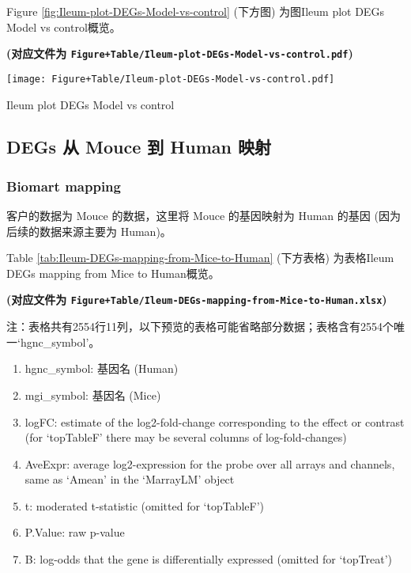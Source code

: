 \documentclass[
]{article}
\providecommand{\tightlist}{%
  \setlength{\itemsep}{0pt}\setlength{\parskip}{0pt}}
\begin{document}
Figure \ref{fig:Ileum-plot-DEGs-Model-vs-control} (下方图) 为图Ileum plot DEGs Model vs control概览。

\textbf{(对应文件为 \texttt{Figure+Table/Ileum-plot-DEGs-Model-vs-control.pdf})}

\def\@captype{figure}
\begin{center}
\texttt{[image: Figure+Table/Ileum-plot-DEGs-Model-vs-control.pdf]}
\caption{Ileum plot DEGs Model vs control}\label{fig:Ileum-plot-DEGs-Model-vs-control}
\end{center}

\hypertarget{degs-ux4ece-mouce-ux5230-human-ux6620ux5c04-1}{%
\subsection{DEGs 从 Mouce 到 Human 映射}\label{degs-ux4ece-mouce-ux5230-human-ux6620ux5c04-1}}

\hypertarget{biomart-mapping-1}{%
\subsubsection{Biomart mapping}\label{biomart-mapping-1}}

客户的数据为 Mouce 的数据，这里将 Mouce 的基因映射为 Human 的基因 (因为后续的数据来源主要为 Human)。

Table \ref{tab:Ileum-DEGs-mapping-from-Mice-to-Human} (下方表格) 为表格Ileum DEGs mapping from Mice to Human概览。

\textbf{(对应文件为 \texttt{Figure+Table/Ileum-DEGs-mapping-from-Mice-to-Human.xlsx})}

\begin{center}\begin{tcolorbox}[colback=gray!10, colframe=gray!50, width=0.9\linewidth, arc=1mm, boxrule=0.5pt]注：表格共有2554行11列，以下预览的表格可能省略部分数据；表格含有2554个唯一`hgnc\_symbol'。
\end{tcolorbox}
\end{center}
\begin{center}\begin{tcolorbox}[colback=gray!10, colframe=gray!50, width=0.9\linewidth, arc=1mm, boxrule=0.5pt]\begin{enumerate}\tightlist
\item hgnc\_symbol:  基因名 (Human)
\item mgi\_symbol:  基因名 (Mice)
\item logFC:  estimate of the log2-fold-change corresponding to the effect or contrast (for ‘topTableF’ there may be several columns of log-fold-changes)
\item AveExpr:  average log2-expression for the probe over all arrays and channels, same as ‘Amean’ in the ‘MarrayLM’ object
\item t:  moderated t-statistic (omitted for ‘topTableF’)
\item P.Value:  raw p-value
\item B:  log-odds that the gene is differentially expressed (omitted for ‘topTreat’)
\end{enumerate}\end{tcolorbox}
\end{center}
\end{document}
